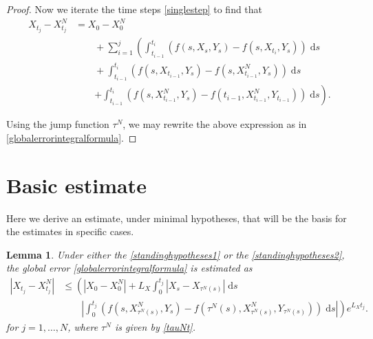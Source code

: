 \documentclass[reqno,12pt]{amsart}
\theoremstyle{plain}%
\newtheorem{lem}{Lemma}[section]
\theoremstyle{definition}
\begin{document}
\begin{proof}
    Now we iterate the time steps \eqref{singlestep} to find that
    \begin{align*}
        X_{t_j} - X_{t_j}^N & = X_0 - X_0^N \\
        & \qquad + \sum_{i=1}^{j} \left(\int_{t_{i-1}}^{t_i} \left( f(s, X_s, Y_s) - f(s, X_{t_{i}}, Y_s) \right)\;\mathrm{d}s \right. \\ 
        & \qquad + \int_{t_{i-1}}^{t_i} \left( f(s, X_{t_{i-1}}, Y_s) - f(s, X_{t_{i-1}}^N, Y_s) \right)\;\mathrm{d}s \\
        & \qquad \left. + \int_{t_{i-1}}^{t_i} \left( f(s, X_{t_{i-1}}^N, Y_s) - f(t_{i-1}, X_{t_{i-1}}^N, Y_{t_{i-1}}) \right)\;\mathrm{d}s \right).
    \end{align*}

    Using the jump function $\tau^N$, we may rewrite the above expression as in \eqref{globalerrorintegralformula}.
\end{proof}

\section{Basic estimate}

Here we derive an estimate, under minimal hypotheses, that will be the basis for the estimates in specific cases.

\begin{lem}
    \label{lembasicestimate}
    Under either the \cref{standinghypotheses1} or the \cref{standinghypotheses2}, the global error \eqref{globalerrorintegralformula} is estimated as
    \begin{equation}
        \label{Etjbasicbound}
        \begin{aligned}
            |X_{t_j} - X_{t_j}^N| & \leq \left( |X_0 - X_0^N| + L_X \int_0^{t_j} |X_s - X_{\tau^N(s)}| \;\mathrm{d}s \right. \\
            & \qquad \left. \left|\int_0^{t_j} \left( f(s, X_{\tau^N(s)}^N, Y_s) - f(\tau^N(s), X_{\tau^N(s)}^N, Y_{\tau^N(s)}) \right)\;\mathrm{d}s\right|\right) e^{L_X t_j}.
        \end{aligned}
    \end{equation}
    for $j=1, \ldots, N$, where $\tau^N$ is given by \eqref{tauNt}.
\end{lem}
\end{document}
